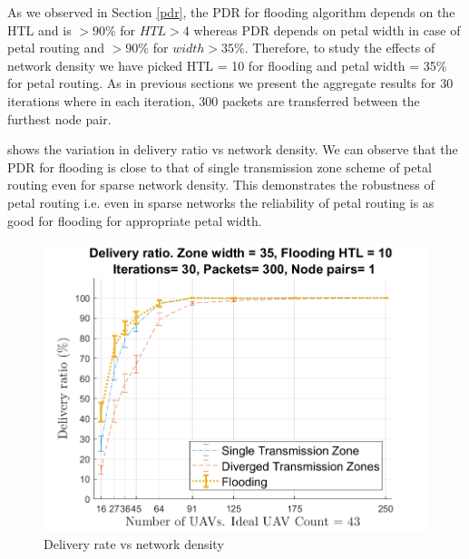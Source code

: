 As we observed in Section \ref{pdr}, the PDR for flooding algorithm depends on the HTL and is $>90\%$ for $HTL>4$ whereas PDR depends on petal width in case of petal routing and $>90\%$ for $width>35\%$. 
Therefore, to study the effects of network density we have picked HTL = 10 for flooding and petal width = 35\% for petal routing. As in previous sections we present the aggregate results for 30 iterations where in each iteration, 300 packets are transferred between the furthest node pair.

 shows the variation in delivery ratio vs network density. We can observe that the PDR for flooding is close to that of single transmission zone scheme of petal routing even for sparse network density. This demonstrates the robustness of petal routing i.e. even in sparse networks the reliability of petal routing is as good for flooding for appropriate petal width.

\begin{figure}[hbtp]
\centering
\includegraphics[width=\simResultFigSize\textwidth]{ncsuthesis-0.6/Chapter-5/figs/ND_DR}
\caption{Delivery rate vs network density}
\label{fig:nd_DR}
\end{figure}

